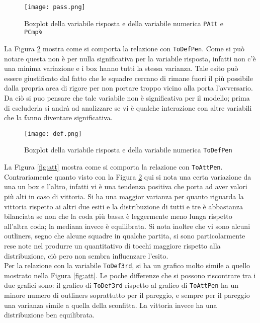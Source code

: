 \begin{figure}[htbp]
	\begin{center}
		\texttt{[image: pass.png]}
		\caption{Boxplot della variabile risposta e della variabile numerica \texttt{PAtt} e \texttt{PCmp\%}  } \label{fig:pass}
	\end{center}
\end{figure}

La Figura \ref{fig:defp} mostra come si comporta la relazione con \texttt{ToDefPen}. Come si può notare questa non è per nulla significativa per la variabile risposta, infatti non c'è una minima variazione e i box hanno tutti la stessa varianza. Tale esito può essere giustificato dal fatto che le squadre cercano di rimane fuori il più possibile dalla propria area di rigore per non portare troppo vicino alla porta l'avversario. Da ciò si puo pensare che tale variabile non è significativa per il modello; prima di escluderla si andrà ad analizzare se vi è qualche interazione con altre variabili che la fanno diventare significativa.\\

\begin{figure}[htbp]
	\begin{center}
		\texttt{[image: def.png]}
		\caption{Boxplot della variabile risposta e della variabile numerica \texttt{ToDefPen} } \label{fig:defp}
	\end{center}
\end{figure}

La Figura \ref{fig:att} mostra come si comporta la relazione con \texttt{ToAttPen}. Contrariamente quanto visto con la Figura \ref{fig:defp} qui si nota una certa variazione da una un box e l'altro, infatti vi è una tendenza positiva che porta ad aver valori più alti in caso di vittoria. Si ha una maggior varianza per quanto riguarda la vittoria rispetto ai altri due esiti e la distribuzione di tutti e tre è abbastanza bilanciata se non che la coda più bassa è leggermente meno lunga rispetto all'altra coda; la mediana invece è equilibrata. Si nota inoltre che vi sono alcuni outliners, segno che alcune squadre in qualche partita, si sono particolarmente rese note nel produrre un quantitativo di tocchi maggiore rispetto alla distribuzione, ciò pero non sembra influenzare l'esito.\\

Per la relazione con la variabile \texttt{ToDef3rd}, si ha un grafico molto simile a quello mostrato nella Figura \ref{fig:att}. Le poche differenze che si possono riscontrare tra i due grafici sono: il grafico di \texttt{ToDef3rd} rispetto al grafico di \texttt{ToAttPen} ha un minore numero di outliners soprattutto per il pareggio, e sempre per il pareggio una varianza simile a quella della sconfitta. La vittoria invece ha una distribuzione ben equilibrata.\\

